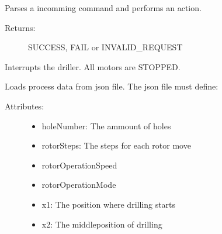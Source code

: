 \documentclass[letterpaper,10pt,english]{sphinxmanual}
\begin{document}
\begin{fulllineitems}
\begin{fulllineitems}
\end{fulllineitems}


\begin{fulllineitems}
\label{bohrvorrichtung:bohrvorrichtung.Bohrvorrichtung.handleCommand}
Parses a incomming command and performs an action.
\begin{description}
\item[{Returns:}] \leavevmode
SUCCESS, FAIL or INVALID\_REQUEST

\end{description}

\end{fulllineitems}


\begin{fulllineitems}
\label{bohrvorrichtung:bohrvorrichtung.Bohrvorrichtung.handleInterrupt}
Interrupts the driller. All motors are STOPPED.

\end{fulllineitems}


\begin{fulllineitems}
\label{bohrvorrichtung:bohrvorrichtung.Bohrvorrichtung.loadProcessData}
Loads process data from json file. The json file must define:
\begin{description}
\item[{Attributes:}] \leavevmode\begin{itemize}
\item {} 
holeNumber: The ammount of holes

\item {} 
rotorSteps: The steps for each rotor move

\item {} 
rotorOperationSpeed

\item {} 
rotorOperationMode

\item {} 
x1: The position where drilling starts

\item {} 
x2: The middleposition of drilling


\end{itemize}
\end{description}
\end{fulllineitems}
\end{fulllineitems}
\end{document}
